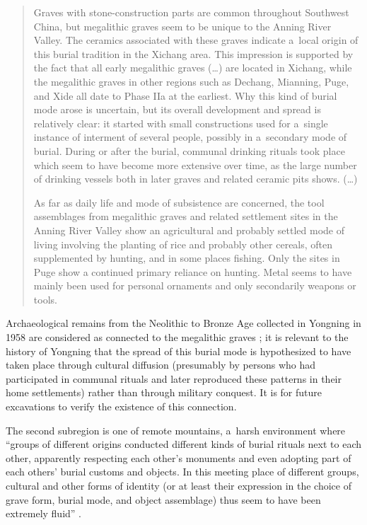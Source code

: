 \begin{quotation}
	Graves with stone-construction parts are common throughout Southwest China, but
	megalithic graves seem to be unique to the Anning River Valley. The ceramics associated with
	these graves indicate a~local origin of this burial tradition in the Xichang area. This impression is
	supported by the fact that all early megalithic graves ({\dots}) are located in Xichang, while the megalithic graves in other regions
	such as Dechang, Mianning, Puge, and Xide all date to Phase IIa at the earliest. Why this kind of
	burial mode arose is uncertain, but its overall development and spread is relatively clear: it
	started with small constructions used for a~single instance of interment of several people,
	possibly in a~secondary mode of burial. During or after the burial, communal drinking rituals
	took place which seem to have become more extensive over time, as the large number of
	drinking vessels both in later graves and related ceramic pits shows. ({\dots})
	
	As far as daily life and mode of subsistence are concerned, the tool assemblages from
	megalithic graves and related settlement sites in the Anning River Valley show an agricultural
	and probably settled mode of living involving the planting of rice and probably other cereals,
	often supplemented by hunting, and in some places fishing. Only the sites in Puge show a
	continued primary reliance on hunting. Metal seems to have mainly been used for personal
	ornaments and only secondarily weapons or tools. \citep[595-599]{hein2013}
	
\end{quotation}	

Archaeological remains from the Neolithic to Bronze Age collected in Yongning in 1958 are considered as connected to the megalithic graves \citep[933]{hein2013}; it is relevant to the history of Yongning that the spread of this burial mode is hypothesized to have taken place through cultural diffusion (presumably by persons who had participated in communal rituals and later reproduced these patterns in their home settlements) rather than through military conquest. It is for future excavations to verify the existence of this connection. 

The second subregion is one of remote mountains, a~harsh environment where “groups of different origins conducted different kinds of
burial rituals next to each other, apparently respecting each other's monuments and even
adopting part of each others' burial customs and objects. In this meeting place of different groups,
cultural and other forms of identity (or at least their expression in the choice of grave form, burial
mode, and object assemblage) thus seem to have been extremely fluid” \citep[602]{hein2013}.

